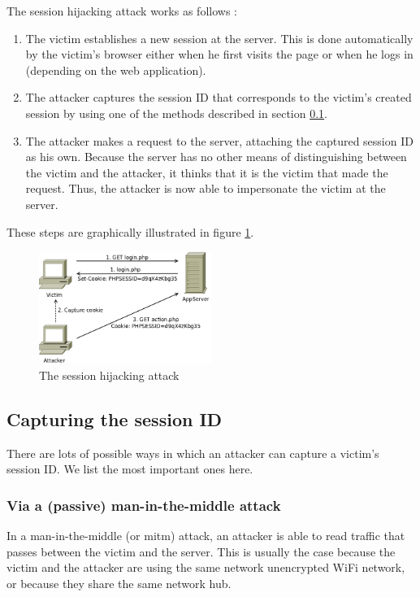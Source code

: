 The session hijacking attack works as follows \cite{Nikiforakis2010}:

\begin{enumerate}
	\item The victim establishes a new session at the server. This is done automatically by the victim's browser either when he first visits the page or when he logs in (depending on the web application).
	\item The attacker captures the session ID that corresponds to the victim's created session by using one of the methods described in section \ref{capturing}.
	\item The attacker makes a request to the server, attaching the captured session ID as his own. Because the server has no other means of distinguishing between the victim and the attacker, it thinks that it is the victim that made the request. Thus, the attacker is now able to impersonate the victim at the server.
\end{enumerate}

These steps are graphically illustrated in figure \ref{fig:hijacking}.

\begin{figure}[ht]
	\centering
	\includegraphics[width=0.50\textwidth]{img/hijacking.png}
	\caption{The session hijacking attack}
	\label{fig:hijacking}
\end{figure}

\subsection{Capturing the session ID}\label{capturing}

There are lots of possible ways in which an attacker can capture a victim's session ID. We list the most important ones here.

\subsubsection{Via a (passive) man-in-the-middle attack}

In a man-in-the-middle (or \gls{mitm}) attack, an attacker is able to read traffic that passes between the victim and the server. This is usually the case because the victim and the attacker are using the same network unencrypted WiFi network, or because they share the same network hub.

